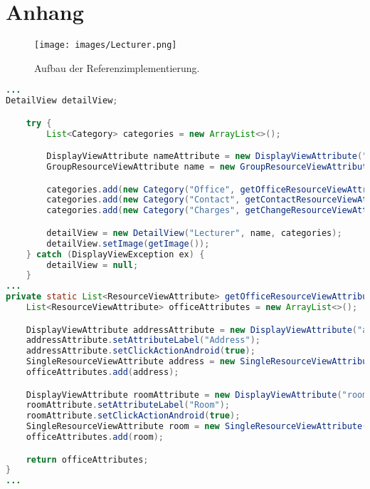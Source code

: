 \chapter{Anhang}

\newpage
\begin{figure}[H]
	\begin{center}
		\texttt{[image: images/Lecturer.png]}
		\caption{Aufbau der Referenzimplementierung.}
		\label{fig:lecturer}
	\end{center}
\end{figure}

\newpage

\begin{lstlisting}[label=lst:detailview_impl,
language=java,
firstnumber=1,
caption=Erstellung einer DetailView.]				   
...
DetailView detailView;

	try {
		List<Category> categories = new ArrayList<>();

		DisplayViewAttribute nameAttribute = new DisplayViewAttribute("name", ViewAttribute.AttributeType.TEXT);
		GroupResourceViewAttribute name = new GroupResourceViewAttribute(nameAttribute, getViewTitleAttributes());

		categories.add(new Category("Office", getOfficeResourceViewAttributes()));
		categories.add(new Category("Contact", getContactResourceViewAttributes()));
		categories.add(new Category("Charges", getChangeResourceViewAttributes()));

		detailView = new DetailView("Lecturer", name, categories);
		detailView.setImage(getImage());
	} catch (DisplayViewException ex) {
		detailView = null;
	}
...
private static List<ResourceViewAttribute> getOfficeResourceViewAttributes() {
	List<ResourceViewAttribute> officeAttributes = new ArrayList<>();

	DisplayViewAttribute addressAttribute = new DisplayViewAttribute("address", ViewAttribute.AttributeType.LOCATION);
	addressAttribute.setAttributeLabel("Address");
	addressAttribute.setClickActionAndroid(true);
	SingleResourceViewAttribute address = new SingleResourceViewAttribute(addressAttribute);
	officeAttributes.add(address);

	DisplayViewAttribute roomAttribute = new DisplayViewAttribute("roomNumber", ViewAttribute.AttributeType.TEXT);
	roomAttribute.setAttributeLabel("Room");
	roomAttribute.setClickActionAndroid(true);
	SingleResourceViewAttribute room = new SingleResourceViewAttribute(roomAttribute);
	officeAttributes.add(room);

	return officeAttributes;
}
...
\end{lstlisting}

